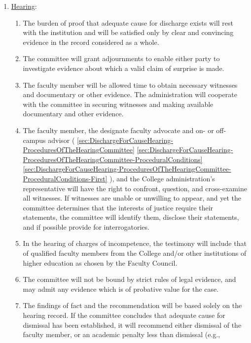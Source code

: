 \begin{enumerate}[label=\alph*)]
{						}
						\item{\underline{Hearing}:
							\label{sec:DischargeForCauseHearing-ProceduresOfTheHearingCommittee-Hearing}
							\begin{enumerate}[label=\arabic*)]
								\item{The burden of proof that adequate cause for discharge exists will rest with the institution and will be satisfied only by clear and convincing evidence in the record considered as a whole.}
								\item{The committee will grant adjournments to enable either party to investigate evidence about which a valid claim of surprise is made.}
								\item{The faculty member will be allowed time to obtain necessary witnesses and documentary or other evidence.  The administration will cooperate with the committee in securing witnesses and making available documentary and other evidence.}
								\item{The faculty member, the designate faculty advocate and on- or off-campus advisor (
									\ref{sec:DischargeForCauseHearing-ProceduresOfTheHearingCommittee}
									\ref{sec:DischargeForCauseHearing-ProceduresOfTheHearingCommittee-ProceduralConditions}
									\ref{sec:DischargeForCauseHearing-ProceduresOfTheHearingCommittee-ProceduralConditions-First}
									), and the College administration's representative will have the right to confront, question, and cross-examine all witnesses.  If witnesses are unable or unwilling to appear, and yet the committee determines that the interests of justice require their statements, the committee will identify them, disclose their statements, and if possible provide for interrogatories.}
								\item{In the hearing of charges of incompetence, the testimony will include that of qualified faculty members from the College and/or other institutions of higher education as chosen by the Faculty Council.}
								\item{The committee will not be bound by strict rules of legal evidence, and may admit any evidence which is of probative value for the case.}
								\item{
									\label{sec:DischargeForCauseHearing-ProceduresOfTheHearingCommittee-Hearing-Seventh}
									The findings of fact and the recommendation will be based solely on the hearing record.
									If the committee concludes that adequate cause for dismissal has been established, it will recommend either dismissal of the faculty member, or an academic penalty less than dismissal (e.g.,
}
\end{enumerate}}
\end{enumerate}
